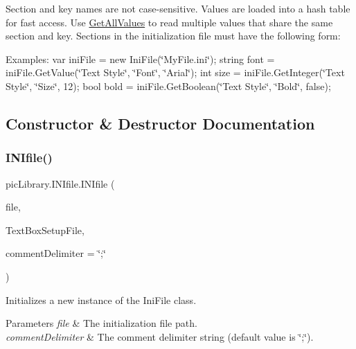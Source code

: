 Section and key names are not case-\/sensitive. Values are loaded into a hash table for fast access. Use \mbox{\hyperlink{classpic_library_1_1_i_n_ifile_a841f8111aed3cef3de338c393d8e0ee5}{Get\+All\+Values}} to read multiple values that share the same section and key. Sections in the initialization file must have the following form\+: 
\begin{DoxyCode}{0}
\DoxyCodeLine{[section]}
\end{DoxyCode}
 Examples\+: var ini\+File = new Ini\+File(\char`\"{}\+My\+File.\+ini\char`\"{}); string font = ini\+File.\+Get\+Value(\char`\"{}\+Text Style\char`\"{}, \char`\"{}\+Font\char`\"{}, \char`\"{}\+Arial\char`\"{}); int size = ini\+File.\+Get\+Integer(\char`\"{}\+Text Style\char`\"{}, \char`\"{}\+Size\char`\"{}, 12); bool bold = ini\+File.\+Get\+Boolean(\char`\"{}\+Text Style\char`\"{}, \char`\"{}\+Bold\char`\"{}, false);

\subsection{Constructor \& Destructor Documentation}
\mbox{\label{classpic_library_1_1_i_n_ifile_a6ac876cf9139c7962dff6454d4f849ec}} 
\subsubsection{\texorpdfstring{INIfile()}{INIfile()}\hspace{0.1cm}{\footnotesize\ttfamily [1/2]}}
{\footnotesize\ttfamily pic\+Library.\+I\+N\+Ifile.\+I\+N\+Ifile (\begin{DoxyParamCaption}\item[{string}]{file,  }\item[{System.\+Windows.\+Forms.\+Rich\+Text\+Box}]{Text\+Box\+Setup\+File,  }\item[{string}]{comment\+Delimiter = {\ttfamily \char`\"{};\char`\"{}} }\end{DoxyParamCaption})\hspace{0.3cm}{\ttfamily [inline]}}



Initializes a new instance of the Ini\+File class. 


\begin{DoxyParams}{Parameters}
{\em file} & The initialization file path.\\
\hline
{\em comment\+Delimiter} & The comment delimiter string (default value is \char`\"{};\char`\"{}). \\
\hline
\end{DoxyParams}
\mbox{\label{classpic_library_1_1_i_n_ifile_ae837a0427f22852092de502c0871b711}} 
